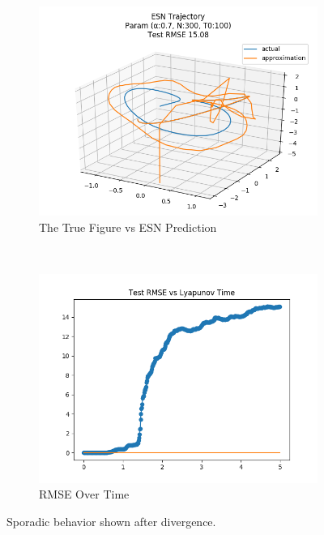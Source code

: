 \documentclass{article}
\begin{document}
\begin{figure}[H]
    \centering
    \begin{subfigure}[b]{0.45\textwidth}
        \includegraphics[width=\textwidth]{doc/paper/images/lorenz/rank_7_param_73_fit.png}
        \caption{The True Figure vs ESN Prediction}
        \label{fig:lorenz_r7_fit}
    \end{subfigure}
    ~
    \begin{subfigure}[b]{0.45\textwidth}
        \includegraphics[width=\textwidth]{doc/paper/images/lorenz/rank_7_param_73_rmse.png}
        \caption{RMSE Over Time}
        \label{fig:lorenz_r7_rmse}
    \end{subfigure}
    \caption{Sporadic behavior shown after divergence.}
    \label{fig:lorenz_r7}
\end{figure}
\end{document}
